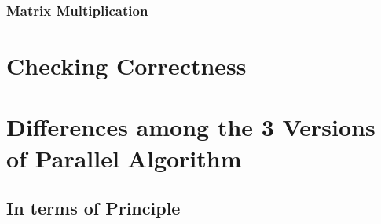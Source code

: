 \documentclass{article}
\newcommand{\cpp}{\lstinline[language=C++]}
\begin{document}
    \subsubsection{Matrix Multiplication}
     
    
     \section{Checking Correctness}
    
    \clearpage
    
    \section{Differences among the 3 Versions of Parallel Algorithm}
    
    \subsection{In terms of Principle}
    \clearpage
    
\end{document}
